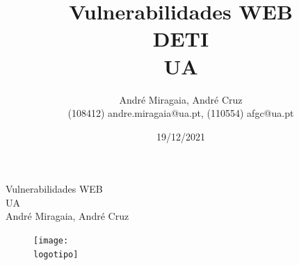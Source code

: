 \documentclass{report}
\begin{document}
%
\def\titulo{Vulnerabilidades WEB}
\def\data{19/12/2021}
\def\autores{André Miragaia, André Cruz}
\def\autorescontactos{(108412) andre.miragaia@ua.pt, (110554) afgc@ua.pt}
\def\versao{VERSAO}
\def\departamento{DETI}
\def\empresa{UA}
\def\logotipo{ua.pdf}
%
%
\begin{titlepage}

\begin{center}
%
\vspace*{50mm}
%
{\Huge \titulo}\\ 
%
\vspace{10mm}
%
{\Large \empresa}\\
%
\vspace{10mm}
%
{\LARGE \autores}\\ 
%
\vspace{30mm}
%
\begin{figure}[h]
\center
\texttt{[image: \\logotipo]}
\end{figure}
%
\vspace{30mm}
\end{center}
%
\begin{flushright}
\end{flushright}
\end{titlepage}

\title{%
{\Huge\textbf{\titulo}}\\
{\Large \departamento\\ \empresa}
}
%
\author{%
    \autores \\
    \autorescontactos
}
%
\date{\data}
%
\maketitle

\end{document}
